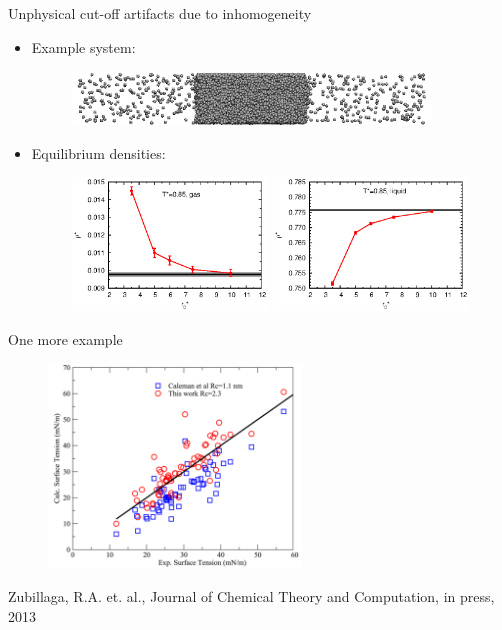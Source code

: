 \documentclass{beamer}
\newcommand{\bluec}[1]{{\color{blue} #1}}
\begin{document}
\begin{frame}{Unphysical cut-off artifacts due to inhomogeneity}
  \begin{itemize}\itemsep 10pt
  \item<1-> Example system:
    \begin{figure}
      \centering
      \includegraphics[width=0.9\textwidth]{figs/t0.85-n16000-rc07.5uni/confout-02.eps}
    \end{figure}
  \item<2-> Equilibrium densities:
    \begin{figure}
    \centering
    \includegraphics[width=0.49\textwidth]{figs/converge.new/t0p85-gas-1.eps} 
    \includegraphics[width=0.49\textwidth]{figs/converge.new/t0p85-liquid-1.eps} 
  \end{figure}  
  \end{itemize}
\end{frame}

\begin{frame}{One more example}
  \begin{figure}
    \centering
    \includegraphics[width=0.6\textwidth]{figs/short-range/membrane-example.pdf} 
  \end{figure}
  \bluec{Zubillaga, R.A. et. al., Journal of Chemical Theory and Computation, in press, 2013}
\end{frame}
\end{document}
